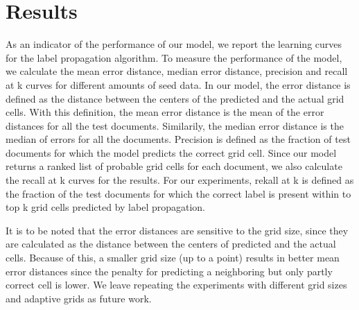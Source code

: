 \section{Results} 

As an indicator of the performance of our model, we report the learning curves
for the label propagation algorithm.  To measure the performance of the model,
we calculate the mean error distance, median error distance, precision and
recall at k curves for different amounts of seed data. In our model, the error
distance is defined as the distance between the centers of the predicted and
the actual grid cells.  With this definition, the mean error distance
is the mean of the error distances for all the test documents. Similarily, the
median error distance is the median of errors for all the documents.
 Precision is defined as the fraction of test documents for which
the model predicts the correct grid cell. Since our model returns a ranked
list of probable grid cells for each document,  we also calculate the recall at k curves for the
results. For our experiments, rekall at k is defined as the fraction of the
test documents for which the correct label is present within to top k grid
cells predicted by label propagation.

It is to be noted that the error distances are sensitive to the grid size,
since they are calculated as the distance between the centers of predicted and
the actual cells. Because of this, a smaller grid size (up to a point) results
in better mean error distances since the penalty for predicting a neighboring
but only partly correct cell is lower. We leave repeating the experiments with
different grid sizes and adaptive grids as future work.
